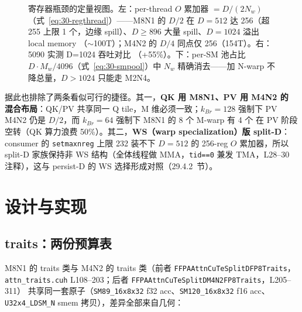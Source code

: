 \begin{figure}[H]
\caption{寄存器瓶颈的定量视图。左：per-thread $O$ 累加器 $=D/(2N_w)$
（式~\ref{eq:30-regthread}）——M8N1 的 $D/2$ 在 $D{=}512$ 达 256（超 255 上限
1 个，边缘 spill）、$D\ge896$ 大量 spill、$D{=}1024$ 溢出 local memory
（$\sim$100T）；M4N2 的 $D/4$ 同点仅 256（154T）。右：5090 实测 D=1024 吞吐对比
（+55\%）。下：per-SM 池占比 $D\cdot M_w/4096$（式~\ref{eq:30-smpool}）中 $N_w$
精确消去——加 N-warp 不降总量，$D{>}1024$ 只能走 M2N4。}
\label{fig:30-reg-pressure}
\end{figure}

据此也排除了两条看似可行的捷径。其一，\textbf{QK 用 M8N1、PV 用 M4N2 的
混合布局}：QK/PV 共享同一 Q tile，M 维必须一致；$k_{Br}=128$ 强制下
PV M4N2 仍是 $D/2$，而 $k_{Br}=64$ 强制下 M8N1 的 8 个 M-warp 有 4 个
在 PV 阶段空转（QK 算力浪费 50\%）。其二，\textbf{WS（warp
specialization）版 split-D}：consumer 的 \texttt{setmaxnreg} 上限 232
装不下 $D=512$ 的 256-reg $O$ 累加器，所以 split-D 家族保持非 WS
结构（全体线程做 MMA，\texttt{tid==0} 兼发 TMA，L28--30 注释），这与
persist-D 的 WS 选择形成对照（29.4.2~节）。

\section{设计与实现}

\subsection{traits：两份预算表}

M8N1 的 traits 类与 M4N2 的 traits 类（前者
\texttt{FFPAAttnCuTeSplitDFP8Traits}，\texttt{attn\_traits.cuh}
L108--203；后者 \texttt{FFPAAttnCuTeSplitDM4N2FP8Traits}，L205--311）
共享同一套原子（\texttt{SM89\_16x8x32} f32 acc、\texttt{SM120\_16x8x32}
f16 acc、\texttt{U32x4\_LDSM\_N} smem 拷贝），差异全部来自几何：

